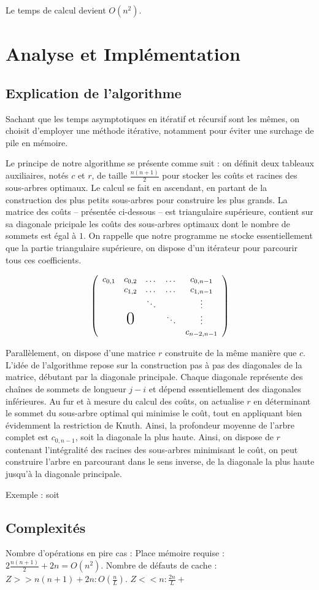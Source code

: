 \documentclass[12pt,a4paper]{article}
\begin{document}
	Le temps de calcul devient $O(n^2)$.
	
	\section{Analyse et Implémentation}
	\subsection{Explication de l'algorithme}
	Sachant que les temps asymptotiques en itératif et récursif sont les mêmes, on choisit d'employer une méthode itérative, notamment pour éviter une surchage de pile en mémoire. \par\leavevmode\par

	Le principe de notre algorithme se présente comme suit : on définit deux tableaux auxiliaires, notés $c$ et $r$, de taille $\frac{n(n+1)}{2}$ pour stocker les coûts et racines des sous-arbres optimaux. Le calcul se fait en ascendant, en partant de la construction des plus petits sous-arbres pour construire les plus grands. La matrice des coûts -- présentée ci-dessous -- est triangulaire supérieure, contient sur sa diagonale pricipale les coûts des sous-arbres optimaux dont le nombre de sommets est égal à $1$. On rappelle que notre programme ne stocke essentiellement que la partie triangulaire supérieure, on dispose d'un itérateur pour parcourir tous ces coefficients. \par\leavevmode\par
	\[
		\left(
		\begin{array}{ccccc}
		  c_{0,1} & c_{0,2} & \dots & \dots & c_{0,n-1} \\
		  &       c_{1,2}       &\dots & \dots  & c_{1,n-1} \\
		  &               & \ddots     &   & \vdots           \\
		  & \text{\huge0} &    &  \ddots   & \vdots       \\
		  &               &   &   & c_{n-2,n-1}
		\end{array}
		\right)
	\]  
	\par\leavevmode\par
	Parallèlement, on dispose d'une matrice $r$ construite de la même manière que $c$. L'idée de l'algorithme repose sur la construction pas à pas des diagonales de la matrice, débutant par la diagonale principale. Chaque diagonale représente des chaînes de sommets de longueur $j - i$ et dépend essentiellement des diagonales inférieures. Au fur et à mesure du calcul des coûts, on actualise $r$ en déterminant le sommet du sous-arbre optimal qui minimise le coût, tout en appliquant bien évidemment la restriction de Knuth. Ainsi, la profondeur moyenne de l'arbre complet est $c_{0,n-1}$, soit la diagonale la plus haute.
	Ainsi, on dispose de $r$ contenant l'intégralité des racines des sous-arbres minimisant le coût, on peut construire l'arbre en parcourant dans le sens inverse, de la diagonale la plus haute jusqu'à la diagonale principale.

	Exemple : soit 

	\subsection{Complexités}
Nombre d'opérations en pire cas : 
Place mémoire requise : $2\frac{n(n+1)}{2} + 2n = O(n^2)$.
Nombre de défauts de cache : $Z >> n(n+1) + 2n : O(\frac{n}{L})$. $Z << n : \frac{2n}{L} + $
\end{document}
